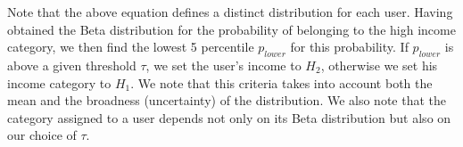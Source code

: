 Note that the above equation defines a distinct distribution for each user. Having obtained the Beta distribution for the probability of belonging to the high income category, we then find the lowest 5 percentile $p_{lower}$ for this probability. If $p_{lower}$ is above a given threshold $\tau$, we set the user's income to $H_2$, otherwise we set his income category to $H_1$. We note that this criteria takes into account both the mean and the broadness (uncertainty) of the distribution. We also note that the category assigned to a user depends not only on its Beta distribution but also on our choice of $\tau$. 


 
 





